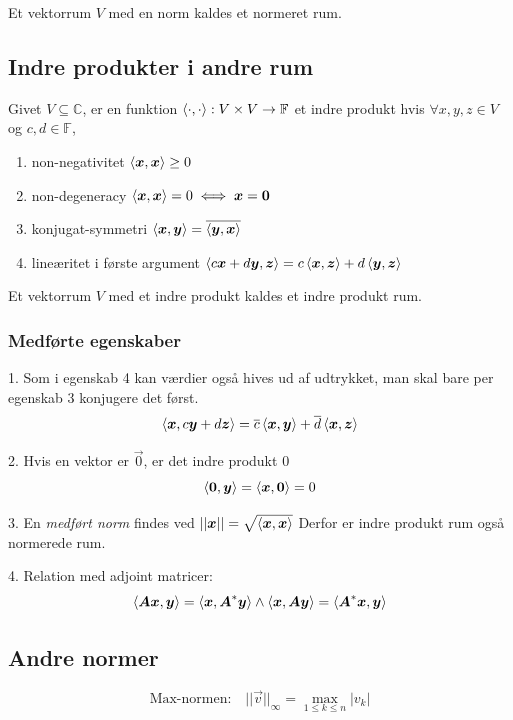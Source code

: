 Et vektorrum $V$ med en norm kaldes et normeret rum.


\subsection{Indre produkter i andre rum}
Givet $V \subseteq \mathbb C$, er en funktion $\left \langle \cdot, \cdot \right \rangle: V \times V \to \mathbb F$ et indre produkt hvis $\forall x, y, z \in V$ og $c, d \in \mathbb F$,
\begin{enumerate}
    \item non-negativitet $\left \langle \boldsymbol{x}, \boldsymbol{x} \right \rangle \geq 0$
    \item non-degeneracy $\left \langle \boldsymbol{x}, \boldsymbol{x} \right \rangle = 0 \iff \boldsymbol{x} = \boldsymbol{0}$
    \item konjugat-symmetri $\left \langle \boldsymbol{x}, \boldsymbol{y} \right \rangle = \overline{\left \langle \boldsymbol{y}, \boldsymbol{x} \right \rangle}$
    \item lineæritet i første argument $\left \langle c \boldsymbol{x} + d \boldsymbol{y}, \boldsymbol{z} \right \rangle = c \left \langle \boldsymbol{x}, \boldsymbol{z} \right \rangle + d \left \langle \boldsymbol{y}, \boldsymbol{z} \right \rangle$
\end{enumerate}

Et vektorrum $V$ med et indre produkt kaldes et indre produkt rum.



\subsubsection{Medførte egenskaber}

1. Som i egenskab 4 kan værdier også hives ud af udtrykket, man skal bare per egenskab 3 konjugere det først.
\[
\left \langle \boldsymbol{x}, c \boldsymbol{y} + d \boldsymbol{z} \right \rangle = \overline{c} \left \langle \boldsymbol{x}, \boldsymbol{y} \right \rangle + \overline{d} \left \langle \boldsymbol{x}, \boldsymbol{z} \right \rangle
\]

2. Hvis en vektor er $\vec 0$, er det indre produkt $0$
\[
\left \langle \boldsymbol{0}, \boldsymbol{y} \right \rangle = \left \langle \boldsymbol{x}, \boldsymbol{0} \right \rangle = 0
\]

3. En \emph{medført norm} findes ved
\(
|| \boldsymbol{x} || = \sqrt{\left \langle \boldsymbol{x}, \boldsymbol{x} \right \rangle}
\)
Derfor er indre produkt rum også normerede rum.

4. Relation med adjoint matricer:
\[
\left \langle \boldsymbol{A} \boldsymbol{x}, \boldsymbol{y} \right \rangle = \left \langle \boldsymbol{x}, \boldsymbol{A}^* \boldsymbol{y} \right \rangle \land
\left \langle \boldsymbol{x}, \boldsymbol{A} \boldsymbol{y} \right \rangle = \left \langle \boldsymbol{A}^* \boldsymbol{x}, \boldsymbol{y} \right \rangle 
\]

\subsection{Andre normer}
\[
\text{Max-normen:} \quad
|| \vec v ||_\infty = \max_{1 \leq k \leq n} |v_k|
\]

